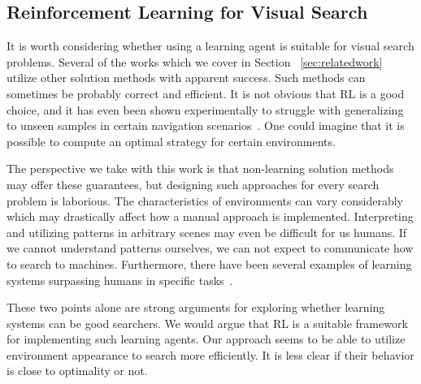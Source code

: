 



\subsection{Reinforcement Learning for Visual Search}

It is worth considering whether using a learning agent is suitable for visual search problems.
Several of the works which we cover in Section ~\ref{sec:relatedwork} utilize other solution methods with apparent success.
Such methods can sometimes be probably correct and efficient.
It is not obvious that RL is a good choice, and it has even been shown experimentally to struggle with generalizing to unseen samples in certain navigation scenarios~\cite{dhiman_critical_2019}.
One could imagine that it is possible to compute an optimal strategy for certain environments.

The perspective we take with this work is that non-learning solution methods may offer these guarantees, but designing such approaches for every search problem is laborious.
The characteristics of environments can vary considerably which may drastically affect how a manual approach is implemented.
Interpreting and utilizing patterns in arbitrary scenes may even be difficult for us humans.
If we cannot understand patterns ourselves, we can not expect to communicate how to search to machines.
Furthermore, there have been several examples of learning systems surpassing humans in specific tasks~\cite{silver_mastering_2016,vinyals_grandmaster_2019}.

These two points alone are strong arguments for exploring whether learning systems can be good searchers.
We would argue that RL is a suitable framework for implementing such learning agents.
Our approach seems to be able to utilize environment appearance to search more efficiently.
It is less clear if their behavior is close to optimality or not.

